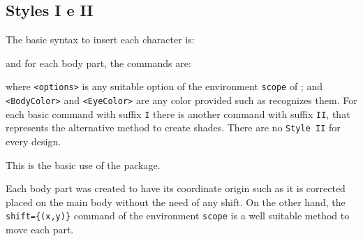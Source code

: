 \documentclass[12pt]{article}
\begin{document}
\subsection{Styles I e II}

The basic syntax to insert each character is:
\begin{FHZtcbAmongUs}
\end{FHZtcbAmongUs}
\noindent
and for each body part, the commands are:
\begin{FHZtcbAmongUs}
\end{FHZtcbAmongUs}
\noindent
where \texttt{<options>} is any suitable option of the environment \texttt{scope} of {\TikZ}; and \texttt{<BodyColor>} and \texttt{<EyeColor>} are any color provided such as {\TikZ} recognizes them.
For each basic command with suffix \texttt{I} there is another command with suffix \texttt{II}, that represents the alternative method to create shades. There are no \texttt{Style II} for every design.

This is the basic use of the package.

\begin{paracol}{2}
\begin{FHZtcbAmongUs}[title=Basic Use -- Style I]
\end{FHZtcbAmongUs}
\switchcolumn
\begin{FHZtcbAmongUs}[title=Basic Use -- Style II]
\end{FHZtcbAmongUs}
\end{paracol}

Each body part was created to have its coordinate origin such as it is corrected placed on the main body without the need of any shift.
On the other hand, the \texttt{shift=\{(x,y)\}} command of the environment \texttt{scope} is a well suitable method to move each part.

\begin{paracol}{2}
\begin{FHZtcbAmongUs}[title=Each body part -- Style I]
\end{FHZtcbAmongUs}
\switchcolumn
\begin{FHZtcbAmongUs}[title=Each body part -- Style II]
\end{FHZtcbAmongUs}
\end{paracol}
\end{document}
